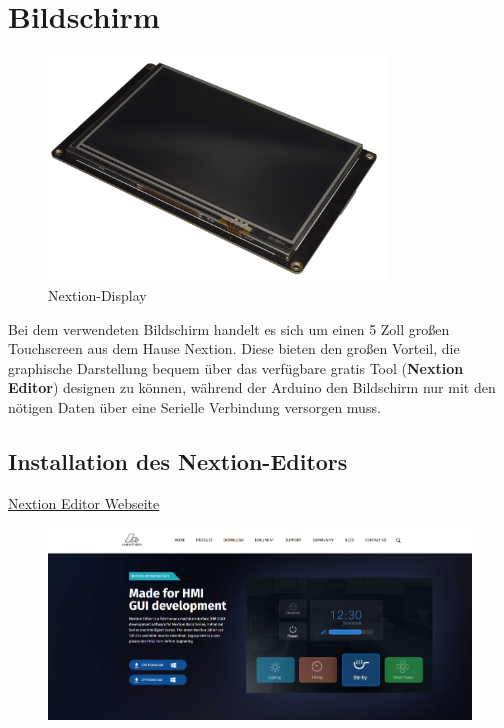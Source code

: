\section{Bildschirm}
\begin{figure}[h]
    \centering
    \includegraphics[width=0.8\textwidth]{Fotos/Nextion_Display.png}
    \caption{Nextion-Display}
\end{figure}
Bei dem verwendeten Bildschirm handelt es sich um einen 5 Zoll großen Touchscreen aus dem Hause Nextion.
Diese bieten den großen Vorteil, die graphische Darstellung bequem über das verfügbare gratis Tool (\textbf{Nextion Editor}) designen zu können, während der Arduino den Bildschirm nur mit den nötigen Daten über eine Serielle Verbindung versorgen muss. 

\newpage
\subsection{Installation des Nextion-Editors}
\href{https://nextion.tech/nextion-editor/}{Nextion Editor Webseite}
\begin{figure}[h]
    \includegraphics[width=1\textwidth]{bilder/Nextion_Webseite.png}
    \caption{}
\end{figure}